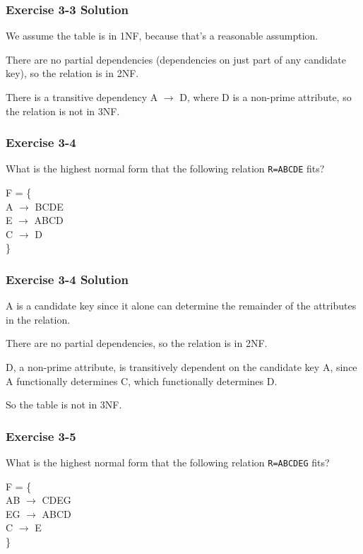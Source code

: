 \begin{frame}
\frametitle{Exercise 3-3 Solution}

We assume the table is in 1NF, because that's a reasonable assumption.

There are no partial dependencies (dependencies on just part of any candidate key), so the relation is in 2NF.

There is a transitive dependency A $\rightarrow$ D, where D is a non-prime attribute, so the relation is not in 3NF.

\end{frame}


\begin{frame}
\frametitle{Exercise 3-4}

What is the highest normal form that the following relation \texttt{R=ABCDE} fits?

F = \{ \\
A $\rightarrow$ BCDE \\
E $\rightarrow$ ABCD \\
C $\rightarrow$ D \\
\}

\end{frame}


\begin{frame}
\frametitle{Exercise 3-4 Solution}

A is a candidate key since it alone can determine the remainder of the attributes in the relation.

There are no partial dependencies, so the relation is in 2NF.

D, a non-prime attribute, is transitively dependent on the candidate key A, since A functionally determines C, which functionally determines D.

So the table is not in 3NF.

\end{frame}


\begin{frame}
\frametitle{Exercise 3-5}

What is the highest normal form that the following relation \texttt{R=ABCDEG} fits?

F = \{ \\
AB $\rightarrow$ CDEG \\
EG $\rightarrow$ ABCD \\
C $\rightarrow$ E \\
\}

\end{frame}


